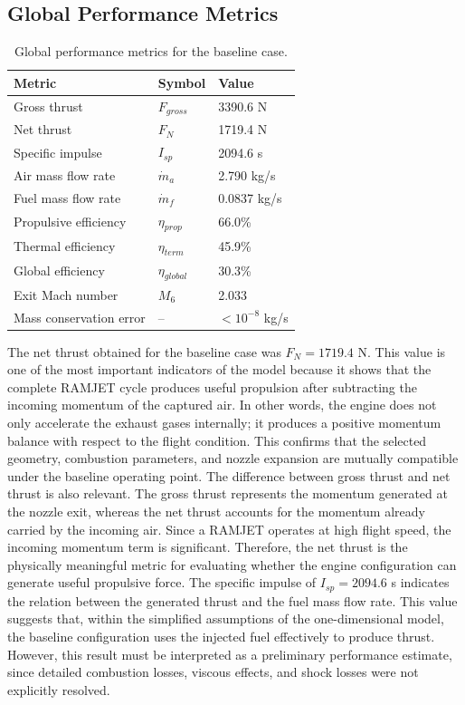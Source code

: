 \documentclass[preprint,12pt]{elsarticle}
\begin{document}
\subsection{Global Performance Metrics}
\begin{table}[H]
\centering
\caption{Global performance metrics for the baseline case.}
\label{tab:performance_metrics}
\begin{tabular}{lll}
\toprule
\textbf{Metric} & \textbf{Symbol} & \textbf{Value} \\
\midrule
Gross thrust & $F_{gross}$ & 3390.6 N \\
Net thrust & $F_N$ & 1719.4 N \\
Specific impulse & $I_{sp}$ & 2094.6 s \\
Air mass flow rate & $\dot{m}_a$ & 2.790 kg/s \\
Fuel mass flow rate & $\dot{m}_f$ & 0.0837 kg/s \\
Propulsive efficiency & $\eta_{prop}$ & 66.0\% \\
Thermal efficiency & $\eta_{term}$ & 45.9\% \\
Global efficiency & $\eta_{global}$ & 30.3\% \\
Exit Mach number & $M_6$ & 2.033 \\
Mass conservation error & -- & $<10^{-8}$ kg/s \\
\bottomrule
\end{tabular}
\end{table}
The net thrust obtained for the baseline case was $F_N=1719.4$ N. This value is one of the most important indicators of the model because it shows that the complete RAMJET cycle produces useful propulsion after subtracting the incoming momentum of the captured air. In other words, the engine does not only accelerate the exhaust gases internally; it produces a positive momentum balance with respect to the flight condition. This confirms that the selected geometry, combustion parameters, and nozzle expansion are mutually compatible under the baseline operating point.
The difference between gross thrust and net thrust is also relevant. The gross thrust represents the momentum generated at the nozzle exit, whereas the net thrust accounts for the momentum already carried by the incoming air. Since a RAMJET operates at high flight speed, the incoming momentum term is significant. Therefore, the net thrust is the physically meaningful metric for evaluating whether the engine configuration can generate useful propulsive force.
The specific impulse of $I_{sp}=2094.6$ s indicates the relation between the generated thrust and the fuel mass flow rate. This value suggests that, within the simplified assumptions of the one-dimensional model, the baseline configuration uses the injected fuel effectively to produce thrust. However, this result must be interpreted as a preliminary performance estimate, since detailed combustion losses, viscous effects, and shock losses were not explicitly resolved.
\end{document}
